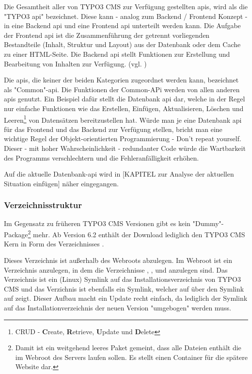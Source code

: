 Die Gesamtheit aller von TYPO3 CMS zur Verfügung gestellten \gls{api}s, wird als die "TYPO3 \gls{api}" bezeichnet. Diese kann - analog zum Backend / Frontend Konzept - in eine Backend \gls{api} und eine Frontend \gls{api} unterteilt werden kann. Die Aufgabe der Frontend \gls{api} ist die Zusammenführung der getrennt vorliegenden Bestandteile (Inhalt, Struktur und Layout) aus der Datenbank oder dem Cache zu einer HTML-Seite. Die Backend \gls{api} stellt Funktionen zur Erstellung und Bearbeitung von Inhalten zur Verfügung. (vgl. \cite[S. 5 ff.]{book:dulepovTypo32008})

Die \gls{api}s, die keiner der beiden Kategorien zugeordnet werden kann, bezeichnet \cite[S. 5 ff.]{book:dulepovTypo32008} als "Common"-\gls{api}. Die Funktionen der Common-APi werden von allen anderen \gls{api}s genutzt. Ein Beispiel dafür stellt die Datenbank \gls{api} dar, welche in der Regel nur einfache Funktionen wie das Erstellen, Einfügen, Aktualisieren, Löschen und Leeren\footnote{CRUD - {\bfseries C}reate, {\bfseries R}etrieve, {\bfseries U}pdate und {\bfseries D}elete} von Datensätzen bereitzustellen hat. Würde man je eine Datenbank \gls{api} für das Frontend und das Backend zur Verfügung stellen, bricht man eine wichtige Regel der Objekt-orientierten Programmierung - Don't repeat yourself. Dieser - mit hoher Wahrscheinlichkeit - redundanter Code würde die Wartbarkeit des Programms verschlechtern und die Fehleranfälligkeit erhöhen.

Auf die aktuelle Datenbank-\gls{api} wird in [KAPITEL zur Analyse der aktuellen Situation einfügen] näher eingegangen.

\subsubsection{Verzeichnisstruktur}

Im Gegensatz zu früheren TYPO3 CMS Versionen gibt es kein "Dummy"-Package\footnote{Damit ist ein weitgehend leeres Paket gemeint, dass alle Dateien enthält die im Web\-root des Servers laufen sollen. Es stellt einen Container für die spätere Website dar.} mehr. Ab Version 6.2 enthält der Download lediglich den TYPO3 CMS Kern in Form des Verzeichnisses .

Dieses Verzeichnis ist außerhalb des Webroots abzulegen. Im Webroot ist ein Verzeichnis  anzulegen, in dem die Verzeichnisse , ,  und  anzulegen sind. Das Verzeichnis  ist ein (Linux) Symlink auf das Installationsverzeichnis von TYPO3 CMS und das Verzichnis  ist ebenfalls ein Symlink, welcher auf über den Symlink  auf  zeigt. Dieser Aufbau macht ein Update recht einfach, da lediglich der Symlink  auf das Installationverzeichnis der neuen Version "umgebogen" werden muss.

